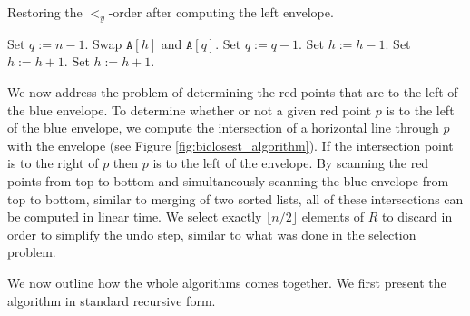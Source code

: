 \begin{algorithm}
  \caption{Restoring the $<_y$-order after computing the left
    envelope.}
  \label{alg:revertLeftHull}
  \begin{algorithmic}[1]
    \STATE Set $q:=n-1$.
        \STATE Swap $\texttt{A}[h]$ and $\texttt{A}[q]$.
        \STATE Set $q:=q-1$.
          \STATE Set $h:=h-1$.
        \ENDIF
          \STATE Set $h:=h+1$.
        \ENDWHILE
      \ELSE
        \STATE Set $h:=h+1$.
      \ENDIF
    \ENDWHILE
  \end{algorithmic}
\end{algorithm}

We now address the problem of determining the red points that are to the left of the blue envelope. To determine whether or not
a given red point $p$ is to the left of the blue envelope, we compute the intersection of a horizontal line through $p$ with the
envelope (see Figure \ref{fig:biclosest_algorithm}). If the intersection point is to the right of $p$ then $p$ is to the left of the envelope.
By scanning the red points from top to bottom and simultaneously scanning the blue envelope from top to bottom, similar to merging
of two sorted lists, all of these intersections can be computed in linear time. We select exactly $\lfloor n/2 \rfloor$ elements of $R$ 
to discard in order to simplify the undo step, similar to what was done in the selection problem.


We now outline how the whole algorithms comes together. We first present the algorithm in standard recursive form.

